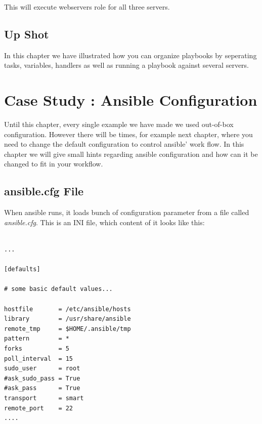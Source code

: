 \documentclass[10pt]{book}
\begin{document}
This will execute webservers role for all three servers.

\section{Up Shot}
In this chapter we have illustrated how you can organize playbooks by seperating tasks, variables, handlers 
as well as running a playbook against several servers.













\chapter{Case Study : Ansible Configuration}
\label{chapter:ansible-configuration}
Until this chapter, every single example we have made we used out-of-box 
configuration. However there will be times, for example next chapter, 
where you need to change the default configuration to control ansible' work 
flow. In this chapter we will give small hints regarding ansible configuration 
and how can it be changed to fit in your workflow.


\section{ansible.cfg File}
 When ansible runs, it loads bunch of configuration parameter from a file called \emph{ansible.cfg}.
 This is an INI file, which content of it looks like this:
 
 
 \begin{verbatim}
 
...

[defaults]

# some basic default values...

hostfile       = /etc/ansible/hosts
library        = /usr/share/ansible
remote_tmp     = $HOME/.ansible/tmp
pattern        = *
forks          = 5
poll_interval  = 15
sudo_user      = root
#ask_sudo_pass = True
#ask_pass      = True
transport      = smart
remote_port    = 22
....

 \end{verbatim}
 
\end{document}
